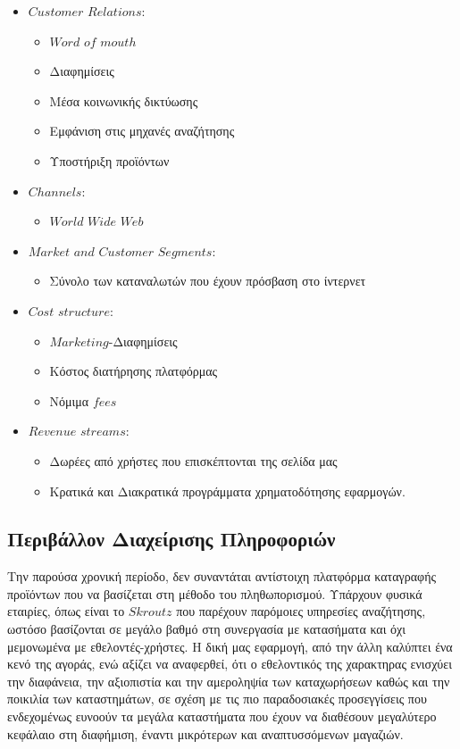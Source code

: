 \documentclass[12pt]{article}
\begin{document}
\begin{itemize}
	\item $Customer$ $Relations$: 
	\begin{itemize}
	\item $Word$ $of$ $mouth$ 
	\item Διαφημίσεις
	\item Μέσα κοινωνικής δικτύωσης 
	\item Εμφάνιση στις μηχανές αναζήτησης
	\item Υποστήριξη προϊόντων	
	\end{itemize}		
	\item $Channels$:
	\begin{itemize}
	\item $World$ $Wide$ $Web$
	\end{itemize}
	\item $Market$ $and$ $Customer$ $Segments$:
	\begin{itemize}
	\item  Σύνολο των καταναλωτών που έχουν πρόσβαση στο ίντερνετ
	\end{itemize}	 

	\item $Cost$ $structure$: 
	\begin{itemize}
	\item $Marketing$-Διαφημίσεις
	\item Κόστος διατήρησης πλατφόρμας
	\item Νόμιμα $fees$
	\end{itemize}		
	\item $Revenue$ $streams$: 
	\begin{itemize}
	\item Δωρέες από χρήστες που επισκέπτονται της σελίδα μας
	\item Κρατικά και Διακρατικά προγράμματα χρηματοδότησης εφαρμογών.
	\end{itemize}


\end{itemize}


\subsection{Περιβάλλον Διαχείρισης Πληροφοριών}

Την παρούσα χρονική περίοδο, δεν συναντάται αντίστοιχη πλατφόρμα καταγραφής προϊόντων που να βασίζεται στη μέθοδο του πληθωπορισμού. Υπάρχουν φυσικά εταιρίες, όπως είναι το $Skroutz$ που παρέχουν παρόμοιες υπηρεσίες αναζήτησης, ωστόσο βασίζονται σε μεγάλο βαθμό στη συνεργασία με κατασήματα και όχι μεμονωμένα με εθελοντές-χρήστες. Η δική μας εφαρμογή, από την άλλη καλύπτει ένα κενό της αγοράς, ενώ αξίζει να αναφερθεί, ότι ο εθελοντικός της χαρακτηρας ενισχύει την διαφάνεια, την αξιοπιστία και την αμεροληψία των καταχωρήσεων καθώς και την ποικιλία των καταστημάτων, σε σχέση με τις πιο παραδοσιακές προσεγγίσεις που ενδεχομένως ευνοούν τα μεγάλα καταστήματα που έχουν να διαθέσουν μεγαλύτερο κεφάλαιο στη διαφήμιση, έναντι μικρότερων και αναπτυσσόμενων μαγαζιών.
\end{document}

